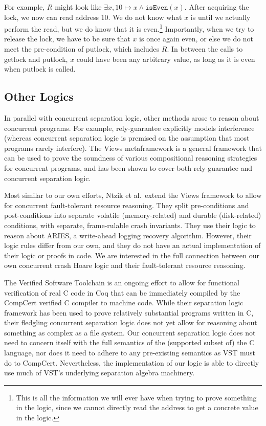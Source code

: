 For example, $R$ might look like $\exists x, 10\mapsto x \wedge
\texttt{isEven}(x)$.  After acquiring the lock, we now can read address $10$.
We do not know what $x$ is until we actually perform the read, but we do know
that it is even.\footnote{This is all the information we will ever have when
trying to prove something in the logic, since we cannot directly read the
address to get a concrete value in the logic.} Importantly, when we try to
release the lock, we have to be sure that $x$ is once again even, or else we do
not meet the pre-condition of putlock, which includes $R$. In between the calls
to getlock and putlock, $x$ could have been any arbitrary value, as long as it
is even when putlock is called.

\subsection{Other Logics}

In parallel with concurrent separation logic, other methods arose to
reason about concurrent programs. For example,
rely-guarantee\cite{jones1981development} explicitly models interference
(whereas concurrent separation logic is premised on the assumption that most
programs rarely interfere). The Views metaframework\cite{dinsdale2013views} is a
general framework that can be used to prove the soundness of various
compositional reasoning strategies for concurrent programs, and has been shown
to cover both rely-guarantee and concurrent separation logic.

Most similar to our own efforts, Ntzik et al.\ extend the Views framework to
allow for concurrent fault-tolerant resource reasoning\cite{ntzik2015fault}.
They split pre-conditions and post-conditions into separate volatile
(memory-related) and durable (disk-related) conditions, with separate,
frame-rulable crash invariants. They use their logic to reason about
ARIES\cite{ntzik2015fault}, a write-ahead logging recovery algorithm. However,
their logic rules differ from our own, and they do not have an actual
implementation of their logic or proofs in code. We are interested in the full
connection between our own concurrent crash Hoare logic and their fault-tolerant
resource reasoning.

The Verified Software Toolchain\cite{appel2014program} is an ongoing effort to
allow for functional verification of real C code in Coq that can be immediately
compiled by the CompCert\cite{leroy2009formal} verified C compiler to machine
code. While their separation logic framework has been used to prove relatively
substantial programs written in C, their fledgling concurrent separation logic
does not yet allow for reasoning about something as complex as a file system.
Our concurrent separation logic does not need to concern itself with the full
semantics of the (supported subset of) the C language, nor does it need to
adhere to any pre-existing semantics as VST must do to CompCert. Nevertheless,
the implementation of our logic is able to directly use much of VST's underlying
separation algebra machinery.


